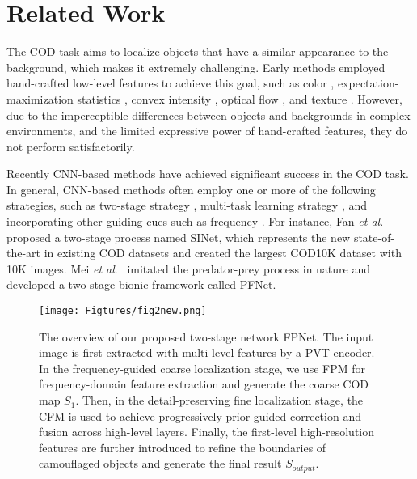 \documentclass[sigconf,screen]{acmart}
\newcommand{\etal}{\textit{et al}.}
\begin{document}
 


\section{Related Work}
The COD task aims to localize objects that have a similar appearance to the background, which makes it extremely challenging. Early methods employed hand-crafted low-level features to achieve this goal, such as color \cite{r2}, expectation-maximization statistics \cite{r13}, convex intensity \cite{r5}, optical flow \cite{r14}, and texture \cite{r1,r3}. However, due to the imperceptible differences between objects and backgrounds in complex environments, and the limited expressive power of hand-crafted features, they do not perform satisfactorily.


Recently CNN-based methods \cite{r41,r7,r15} have achieved significant success in the COD task. 
In general, CNN-based methods often employ one or more of the following strategies, such as two-stage strategy \cite{r7,r16}, multi-task learning strategy \cite{r38}, and incorporating other guiding cues such as frequency \cite{r56}. 
For instance, Fan \etal~\cite{r7} proposed a two-stage process named SINet, which represents the new state-of-the-art in existing COD datasets and created the largest COD10K dataset with 10K images. 
Mei \etal~\cite{r15} imitated the predator-prey process in nature and developed a two-stage bionic framework called PFNet.


\begin{figure*}[t]
\centering
\texttt{[image: Figtures/fig2new.png]}
\caption{The overview of our proposed two-stage network FPNet. The input image is first extracted with multi-level features by a PVT encoder. In the frequency-guided coarse localization stage, we use FPM for frequency-domain feature extraction and generate the coarse COD map $S_1$. Then, in the detail-preserving fine localization stage, the CFM is used to achieve progressively prior-guided correction and fusion across high-level layers. Finally, the first-level high-resolution features are further introduced to refine the boundaries of camouflaged objects and generate the final result $S_{output}$.
}
\label{fig:2}
\end{figure*}
\end{document}
